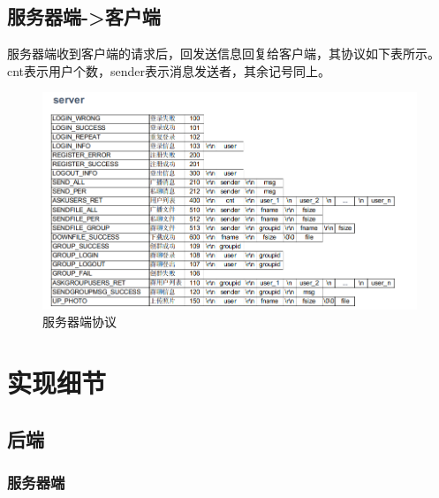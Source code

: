 \documentclass[12pt]{article} %
\begin{document}
\begin{sloppypar}
\subsection{服务器端->客户端}
服务器端收到客户端的请求后，回发送信息回复给客户端，其协议如下表所示。cnt表示用户个数，sender表示消息发送者，其余记号同上。
\begin{figure}[h]
	\centering
	\includegraphics[width=0.9\linewidth]{figure/server.png}
	\caption{服务器端协议}
\end{figure}

\section{实现细节}
\label{sec:detials}

\subsection{后端}

\subsubsection{服务器端}


\end{sloppypar}
\end{document}
